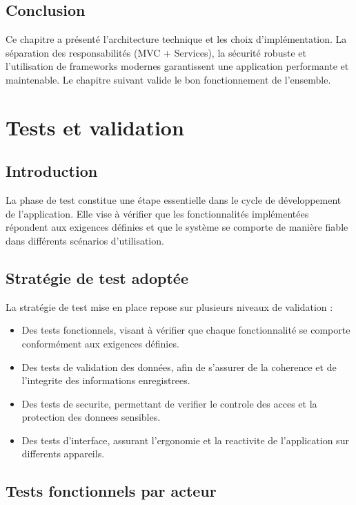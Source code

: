 \documentclass[12pt, a4paper, openright]{report}
\begin{document}
\section{Conclusion}

Ce chapitre a présenté l'architecture technique et les choix d'implémentation. La séparation des responsabilités (MVC + Services), la sécurité robuste et l'utilisation de frameworks modernes garantissent une application performante et maintenable. Le chapitre suivant valide le bon fonctionnement de l'ensemble.

\cleardoublepage
\chapter{Tests et validation}
\thispagestyle{fancy}

\section{Introduction}

La phase de test constitue une étape essentielle dans le cycle de développement de l'application. Elle vise à vérifier que les fonctionnalités implémentées répondent aux exigences définies et que le système se comporte de manière fiable dans différents scénarios d'utilisation.

\section{Stratégie de test adoptée}

La stratégie de test mise en place repose sur plusieurs niveaux de validation :

\begin{itemize}
    \item Des tests fonctionnels, visant à vérifier que chaque fonctionnalité se comporte conformément aux exigences définies.
    \item Des tests de validation des données, afin de s'assurer de la coherence et de l'integrite des informations enregistrees.
    \item Des tests de securite, permettant de verifier le controle des acces et la protection des donnees sensibles.
    \item Des tests d'interface, assurant l'ergonomie et la reactivite de l'application sur differents appareils.
\end{itemize}

\section{Tests fonctionnels par acteur}
\end{document}
